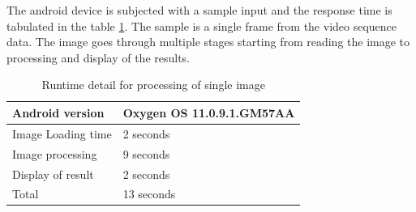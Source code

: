 	The android device is subjected with a sample input and the response time is tabulated in the table \ref{table:response_of_android}. The sample is a single frame from the video sequence data. The image goes through multiple stages starting from reading the image to processing and display of the results. 
	
	\begin{table}[h]
		\begin{center}
			\begin{tabular}{ | l | p{3cm} |}
				\hline
				
				Android version & Oxygen OS 11.0.9.1.GM57AA \\ \hline
				Image Loading time & 2 seconds \\ \hline
				Image processing & 9 seconds \\ \hline
				Display of result & 2 seconds \\ \hline
				Total & 13 seconds \\ \hline
				\hline
			\end{tabular}
			\caption{Runtime detail for processing of single image}
			\label{table:response_of_android}
		\end{center}
	\end{table}    
    

